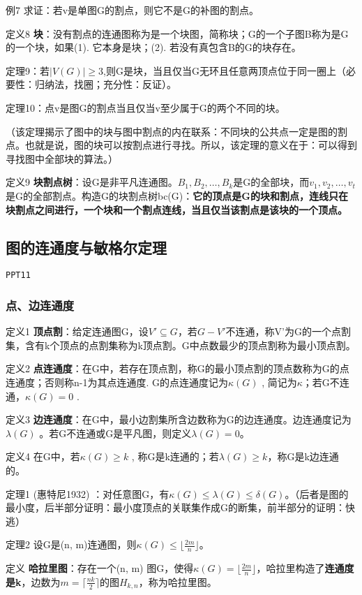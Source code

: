 \documentclass{article}
\begin{document}
例7 求证：若v是单图G的割点，则它不是G的补图的割点。

定义8 \textbf{块}：没有割点的连通图称为是一个块图，简称块；G的一个子图B称为是G的一个块，如果(1). 它本身是块；(2). 若没有真包含B的G的块存在。

定理9：若$|V(G)|\ge 3$,则G是块，当且仅当G无环且任意两顶点位于同一圈上（必要性：归纳法，找圈；充分性：反证）。

定理10：点v是图G的割点当且仅当v至少属于G的两个不同的块。

（该定理揭示了图中的块与图中割点的内在联系：不同块的公共点一定是图的割点。也就是说，图的块可以按割点进行寻找。所以，该定理的意义在于：可以得到寻找图中全部块的算法。）

定义9 \textbf{块割点树}：设G是非平凡连通图。$B_1, B_2 ,…, B_k$是G的全部块，而$v_1,v_2,…,v_t$是G的全部割点。构造G的块割点树bc(G)：\textbf{它的顶点是G的块和割点，连线只在块割点之间进行，一个块和一个割点连线，当且仅当该割点是该块的一个顶点。}

\subsection{图的连通度与敏格尔定理}

\texttt{PPT11}

\subsubsection{点、边连通度}

定义1 \textbf{顶点割}：给定连通图G，设$V' \subseteq G$，若$G - V'$不连通，称V'为G的一个点割集，含有k个顶点的点割集称为k顶点割。G中点数最少的顶点割称为最小顶点割。

定义2 \textbf{点连通度}：在G中，若存在顶点割，称G的最小顶点割的顶点数称为G的点连通度；否则称n-1为其点连通度. G的点连通度记为$\kappa(G)$ , 简记为$\kappa$；若G不连通，$\kappa(G) = 0$ .

定义3 \textbf{边连通度}：在G中，最小边割集所含边数称为G的边连通度。边连通度记为$\lambda(G)$ 。若G不连通或G是平凡图，则定义$\lambda(G) =0$。

定义4 在G中，若$\kappa(G) \ge k$ , 称G是k连通的；若$\lambda(G) \ge k$，称G是k边连通的。

定理1 (惠特尼1932) ：对任意图G，有$\kappa(G) \le \lambda(G) \le \delta(G)$。（后者是图的最小度，后半部分证明：最小度顶点的关联集作成G的断集，前半部分的证明：快逃）

定理2 设G是(n, m)连通图，则$\kappa(G) \le \lfloor \frac{2m}{n} \rfloor$。

定义 \textbf{哈拉里图}：存在一个(n, m) 图G，使得$\kappa(G)  = \lfloor \frac{2m}{n} \rfloor$，哈拉里构造了\textbf{连通度是k}，边数为$m  = \lceil \frac{nk}{2} \rceil$的图$H_{k,n}$，称为哈拉里图。
\end{document}
